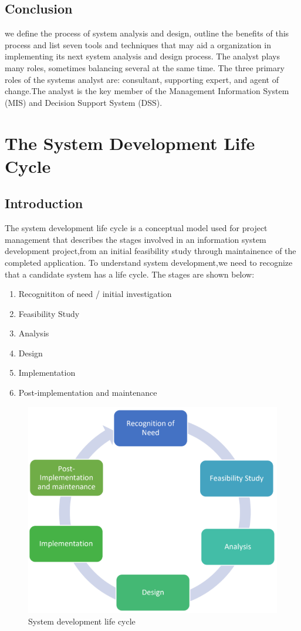 \documentclass[a4paper,12pt]{report}
\begin{document}
\section{Conclusion}

 we define the process of system analysis and design, outline the benefits of this process and list seven tools and techniques that may aid a organization in implementing its next system analysis and design process.
 The analyst plays many roles, sometimes balancing several at the same time. The three primary roles of the systems analyst are: consultant, supporting expert, and agent of change.The analyst is the key member of the Management Information System (MIS) and Decision Support System (DSS).





\newpage
\chapter{The System Development Life Cycle }
\section{Introduction}
The system development life cycle is a conceptual model used for project management that describes the stages involved in an information system development project,from an initial feasibility study through maintainence of the completed application. To understand system development,we need to recognize that a candidate system has a life cycle. The stages are shown below:
\begin{enumerate}
	\item   Recognititon of need / initial investigation
	\item	Feasibility Study
	\item	Analysis
	\item   Design
	\item	Implementation
	\item	Post-implementation and maintenance   
	\end{enumerate}
\begin{figure}[h]
	\centering
	\includegraphics[width=0.7\linewidth]{2_1}
	\caption{System development life cycle}
	\label{fig:2_1}
\end{figure}
\end{document}

